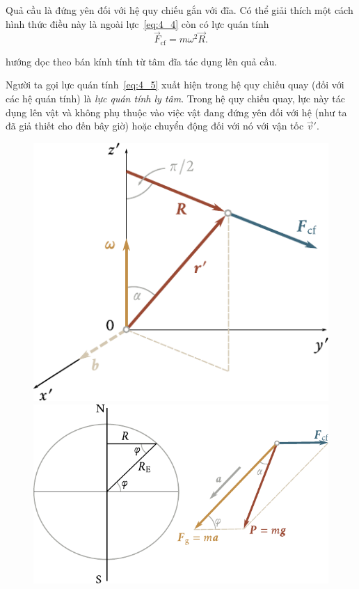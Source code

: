 Quả cầu là đứng yên đối với hệ quy chiếu gắn với đĩa. Có thể giải thích một cách hình thức điều này là ngoài lực~\eqref{eq:4_4} còn có lực quán tính
\begin{equation}\label{eq:4_5}
\vec{F}_{\text{cf}} = m\omega^2\vec{R}.
\end{equation}

\noindent
hướng dọc theo bán kính tính từ tâm đĩa tác dụng lên quả cầu.

Người ta gọi lực quán tính~\eqref{eq:4_5} xuất hiện trong hệ quy chiếu quay (đối với các hệ quán tính) là \textit{lực quán tính ly tâm}. Trong hệ quy chiếu quay, lực này tác dụng lên vật và không phụ thuộc vào việc vật đang đứng yên đối với hệ (như ta đã giả thiết cho đến bây giờ) hoặc chuyển động đối với nó với vận tốc $\vec{v}'$.

\begin{figure}[!htb]
	\begin{minipage}[t]{0.5\linewidth}
		\begin{center}
			\includegraphics[scale=0.6]{figures/ch_04/fig_4_4.pdf}
			\caption[]{}
			\label{fig:4_4}
		\end{center}
	\end{minipage}
	\hspace{-0.05cm}
	\begin{minipage}[t]{0.5\linewidth}
		\begin{center}
			\includegraphics[scale=0.6]{figures/ch_04/fig_4_5.pdf}

\end{center}
\end{minipage}
\end{figure}
